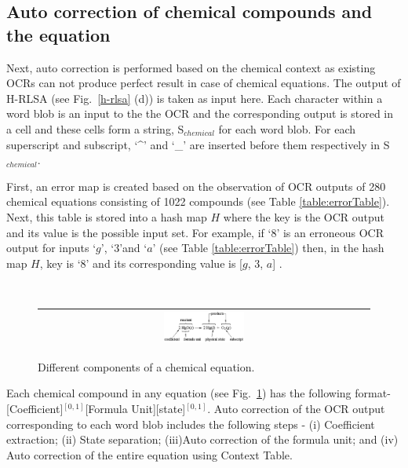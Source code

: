 \documentclass[conference]{IEEEtran}
\begin{document}
\subsection{Auto correction of chemical compounds and the equation}

Next, auto correction is performed based on the chemical context as existing OCRs can not produce perfect result in case of chemical equations.  The output of H-RLSA  (see Fig.~\ref{h-rlsa} (d)) is taken as input here. 
Each character within a word blob is an input to the the OCR and the corresponding output  is stored in a cell and these cells form a string, S$_{chemical}$ for each word blob. For each superscript and subscript, `\^{}'  and  `\_' are inserted before them respectively in S$_{chemical}$.

 First, an error map is created based on the observation of OCR outputs of 280 chemical equations consisting of 1022 compounds (see Table \ref{table:errorTable}). Next, this table is stored into a hash map $H$ where the key is the OCR output and its value is the possible input set.
For example, if `$8$' is an erroneous OCR output for inputs `$g$', `$3$'and `$a$' (see Table \ref{table:errorTable}) then, in the hash map $H$, key is `$8$' and its corresponding value is [$g$, $3$, $a$] .

\begin{figure}[h]
\center\ 
\begin{tabular}{|c|} 
\hline
\includegraphics[width=0.25\textwidth]{chemEqParts.png}\\
\hline
\end{tabular} 
\caption{Different components of a chemical equation. }
\label{chemEqParts} 
\end{figure}  

 Each chemical compound in any equation (see Fig.~\ref{chemEqParts}) has the following format- [Coefficient]$^{[0,1]}$[Formula Unit][state]$^{[0,1]}$. Auto correction of the OCR output corresponding to each word blob includes the following steps - (i) Coefficient extraction; (ii) State separation; (iii)Auto correction of the formula unit; and (iv) Auto correction of the entire equation using Context Table.

\end{document}
